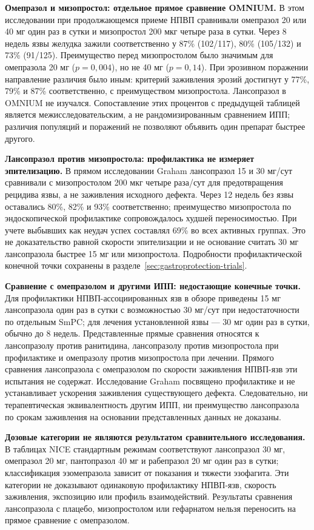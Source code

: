 \documentclass[11pt,a4paper,notitlepage]{report}
\newcommand{\src}[1]{\unskip\space\cite{#1}}
\begin{document}
\textbf{Омепразол и мизопростол: отдельное прямое сравнение OMNIUM.} В этом исследовании при продолжающемся приеме НПВП сравнивали омепразол 20 или 40 мг один раз в сутки и мизопростол 200 мкг четыре раза в сутки. Через 8 недель язвы желудка зажили соответственно у 87\% (102/117), 80\% (105/132) и 73\% (91/125). Преимущество перед мизопростолом было значимым для омепразола 20 мг ($p=0{,}004$), но не 40 мг ($p=0{,}14$). При эрозивном поражении направление различия было иным: критерий заживления эрозий достигнут у 77\%, 79\% и 87\% соответственно, с преимуществом мизопростола. Лансопразол в OMNIUM не изучался. Сопоставление этих процентов с предыдущей таблицей является межисследовательским, а не рандомизированным сравнением ИПП; различия популяций и поражений не позволяют объявить один препарат быстрее другого.\src{nsaidomnium1998}

\textbf{Лансопразол против мизопростола: профилактика не измеряет эпителизацию.} В прямом исследовании Graham лансопразол 15 и 30 мг/сут сравнивали с мизопростолом 200 мкг четыре раза/сут для предотвращения рецидива язвы, а не заживления исходного дефекта. Через 12 недель без язвы оставались 80\%, 82\% и 93\% соответственно; преимущество мизопростола по эндоскопической профилактике сопровождалось худшей переносимостью. При учете выбывших как неудач успех составлял 69\% во всех активных группах. Это не доказательство равной скорости эпителизации и не основание считать 30 мг лансопразола быстрее 15 мг или мизопростола. Подробности профилактической конечной точки сохранены в разделе~\ref{sec:gastroprotection-trials}.\src{misotrial}

\textbf{Сравнение с омепразолом и другими ИПП: недостающие конечные точки.} Для профилактики НПВП-ассоциированных язв в обзоре приведены 15 мг лансопразола один раз в сутки с возможностью 30 мг/сут при недостаточности по отдельным SmPC; для лечения установленной язвы --- 30 мг один раз в сутки, обычно до 8 недель. Представленные прямые сравнения относятся к лансопразолу против ранитидина, лансопразолу против мизопростола при профилактике и омепразолу против мизопростола при лечении. Прямого сравнения лансопразола с омепразолом по скорости заживления НПВП-язв эти испытания не содержат. Исследование Graham посвящено профилактике и не устанавливает ускорения заживления существующего дефекта. Следовательно, ни терапевтическая эквивалентность другим ИПП, ни преимущество лансопразола по срокам заживления на основании представленных данных не доказаны.\src{uslabel,hpra,misotrial}

\textbf{Дозовые категории не являются результатом сравнительного исследования.} В таблицах NICE стандартным режимам соответствуют лансопразол 30 мг, омепразол 20 мг, пантопразол 40 мг и рабепразол 20 мг один раз в сутки; классификация эзомепразола зависит от показания и тяжести эзофагита. Эти категории не доказывают одинаковую профилактику НПВП-язв, скорость заживления, экспозицию или профиль взаимодействий. Результаты сравнения лансопразола с плацебо, мизопростолом или гефарнатом нельзя переносить на прямое сравнение с омепразолом.\src{nice,misotrial,nsaid15}
\end{document}
